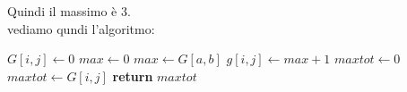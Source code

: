 \documentclass[a4paper,12pt, oneside]{book}
\begin{document}
Quindi il massimo è 3.\\
vediamo qundi l'algoritmo:
\begin{algorithm}[H]
  \begin{algorithmic}
    \State $G[i,j]\gets 0$
    \Else
    \State $max\gets 0$
    \State $max \gets G[a,b]$
    \EndIf
    \EndFor
    \EndFor
    \State $g[i,j] \gets max +1$
    \EndIf
    \EndFor
    \EndFor
    \State $maxtot \gets 0$
    \State $maxtot \gets G[i,j]$
    \EndIf
    \EndFor
    \EndFor
    \State \textbf{return} $maxtot$
    \EndFunction
  \end{algorithmic}
\end{algorithm}
\newpage
\end{document}
